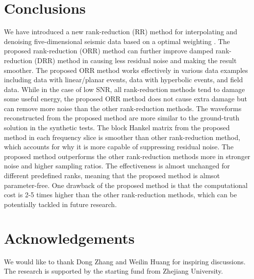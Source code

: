 {%
\section{Conclusions}
We have introduced a new rank-reduction (RR) method for interpolating and denoising five-dimensional seismic data based on a optimal weighting . The proposed  rank-reduction (ORR) method can further improve  damped rank-reduction (DRR) method in causing less residual noise and making the result smoother. The proposed ORR method works effectively in various data examples including data with linear/planar events, data with hyperbolic events, and field data. While in the case of low SNR, all rank-reduction methods tend to damage some useful energy, the proposed ORR method does not cause extra damage but can remove more noise than the other rank-reduction methods. The waveforms reconstructed from the proposed method are more similar to the ground-truth solution in the synthetic tests. The block Hankel matrix from the proposed method in each frequency slice is smoother than other rank-reduction method, which accounts for why it is more capable of suppressing residual noise. The proposed method outperforms the other rank-reduction methods more in stronger noise and higher sampling ratios. The effectiveness is almost unchanged for different predefined ranks, meaning that the proposed method is almsot parameter-free. One drawback of the proposed method is that the computational cost is 2-5 times higher than the other rank-reduction methods, which can be potentially tackled in future research.


\section{Acknowledgements}
We would like to thank Dong Zhang and Weilin Huang for inspiring discussions.  The research is supported by the starting fund from Zhejiang University.


}
